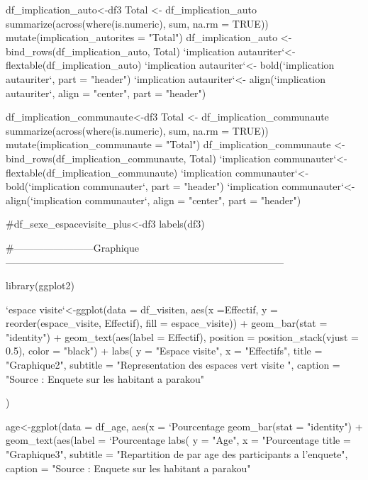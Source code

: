 df_implication_auto<-df3%
Total <- df_implication_auto %
  summarize(across(where(is.numeric), sum, na.rm = TRUE)) %
  mutate(implication_autorites = "Total")
df_implication_auto <- bind_rows(df_implication_auto, Total)
`implication autauriter`<- flextable(df_implication_auto)
`implication autauriter`<- bold(`implication autauriter`, part = "header")
`implication autauriter`<- align(`implication autauriter`, align = "center", part = "header")






df_implication_communaute<-df3%
Total <- df_implication_communaute %
  summarize(across(where(is.numeric), sum, na.rm = TRUE)) %
  mutate(implication_communaute = "Total")
df_implication_communaute <- bind_rows(df_implication_communaute, Total)
`implication communauter`<- flextable(df_implication_communaute)
`implication communauter`<- bold(`implication communauter`, part = "header")
`implication communauter`<- align(`implication communauter`, align = "center", part = "header")






#df_sexe_espacevisite_plus<-df3%
labels(df3)



#------------------------Graphique------------------------------------------------------------------------------------

library(ggplot2)

`espace visite`<-ggplot(data = df_visiten, aes(x =Effectif, y = reorder(espace_visite, Effectif), fill = espace_visite)) +
  geom_bar(stat = "identity") +
  geom_text(aes(label = Effectif), position = position_stack(vjust = 0.5), color = "black") +
  labs(
    y = "Espace visite",
    x = "Effectifs",
    title = "Graphique2",
    subtitle = "Representation des espaces vert visite ",
    caption = "Source : Enquete sur les habitant a parakou"
    
  )

age<-ggplot(data = df_age, aes(x = `Pourcentage%
  geom_bar(stat = "identity") +
  geom_text(aes(label = `Pourcentage%
  labs(
    y = "Age",
    x = "Pourcentage %
    title = "Graphique3",
    subtitle = "Repartition de par age des participants a l'enquete",
    caption = "Source : Enquete sur les habitant a parakou"
    
